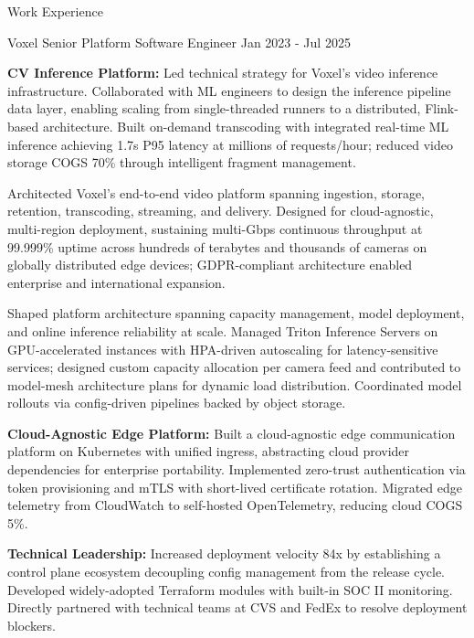 \documentclass{resume} %
\begin{document}
\begin{rSection}{Work Experience}
    \begin{workexperience}
        {Voxel}
        {Senior Platform Software Engineer}
        {Jan 2023 - Jul 2025}
        {
            \textbf{CV Inference Platform:}
            Led technical strategy for Voxel’s video inference infrastructure. Collaborated with ML engineers to design the inference pipeline data layer, enabling scaling from single-threaded runners to a distributed, Flink-based architecture. Built on-demand transcoding with integrated real-time ML inference achieving 1.7s P95 latency at millions of requests/hour; reduced video storage COGS 70\% through intelligent fragment management.
            \vspace{-0.2em}

            Architected Voxel’s end-to-end video platform spanning ingestion, storage, retention, transcoding, streaming, and delivery. Designed for cloud-agnostic, multi-region deployment, sustaining multi-Gbps continuous throughput at 99.999\% uptime across hundreds of terabytes and thousands of cameras on globally distributed edge devices; GDPR-compliant architecture enabled enterprise and international expansion.

            Shaped platform architecture spanning capacity management, model deployment, and online inference reliability at scale. Managed Triton Inference Servers on GPU-accelerated instances with HPA-driven autoscaling for latency-sensitive services; designed custom capacity allocation per camera feed and contributed to model-mesh architecture plans for dynamic load distribution. Coordinated model rollouts via config-driven pipelines backed by object storage.

            \textbf{Cloud-Agnostic Edge Platform:}
            Built a cloud-agnostic edge communication platform on Kubernetes with unified ingress, abstracting cloud provider dependencies for enterprise portability. Implemented zero-trust authentication via token provisioning and mTLS with short-lived certificate rotation. Migrated edge telemetry from CloudWatch to self-hosted OpenTelemetry, reducing cloud COGS 5\%.

            \textbf{Technical Leadership:}
            Increased deployment velocity 84x by establishing a control plane ecosystem decoupling config management from the release cycle. Developed widely-adopted Terraform modules with built-in SOC II monitoring. Directly partnered with technical teams at CVS and FedEx to resolve deployment blockers.
        }
    \end{workexperience}


\end{rSection}
\end{document}
